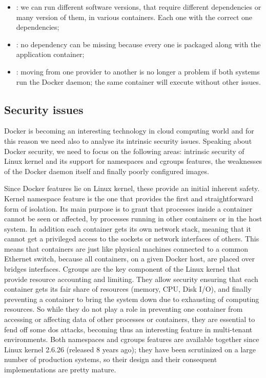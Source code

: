\begin{itemize}
	\item{: we can run different software versions, that require
		different dependencies or many version of them, in various containers. Each one with
		the correct one dependencies;}
	\item{: no dependency can be missing because every one is packaged
		along with the application container;}
	\item{: moving from one provider to another is no longer a
		problem if both systems run the Docker daemon; the same container will execute without other
		issues.}
\end{itemize}

\subsection{Security issues}
\label{sec:background-docker-security}
Docker is becoming an interesting technology in cloud computing world and for this reason we need also
to analyse its intrinsic security issues. Speaking about Docker security, we need to focus on the following
areas: intrinsic security of Linux kernel and its support for namespaces and cgroups features, the weaknesses
of the Docker daemon itself and finally poorly configured images.

Since Docker features lie on Linux kernel, these provide an initial inherent safety. Kernel namespace
feature is the one that provides the first and straightforward form of isolation. Its main purpose is
to grant that processes inside a container cannot be seen or affected, by processes running
in other containers or in the host system. In addition each container gets its own network stack, meaning
that it cannot get a privileged access to the sockets or network interfaces of others. This means that
containers are just like physical machines connected to a common Ethernet switch, because all containers, on
a given Docker host, are placed over bridges interfaces. Cgroups are the key component of the Linux kernel
that provide resource accounting and limiting. They allow security ensuring that each container gets its fair
share of resources (memory, CPU, Disk I/O), and finally preventing a container to bring the system down due to
exhausting of computing resources. So while they do not play a role in preventing one container from accessing or
affecting data of other processes or containers, they are essential to fend off some \ac{dos} attacks, becoming
thus an interesting feature in multi-tenant environments. Both namespaces and cgroups features are available
together since Linux kernel 2.6.26 (released 8 years ago); they have been scrutinized on a large number of
production systems, so their design and their consequent implementations are pretty mature.

